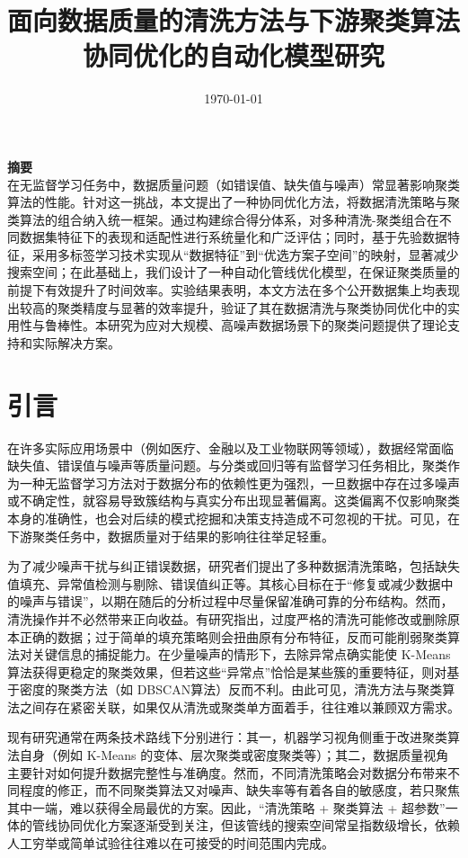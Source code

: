 \documentclass[10pt]{article} %
\numberwithin{equation}{section}
\begin{document}
\title{\textbf{面向数据质量的清洗方法与下游聚类算法协同优化的自动化模型研究}}
\date{\today}
\maketitle

\noindent\textbf{\large 摘要} \\ 
在无监督学习任务中，数据质量问题（如错误值、缺失值与噪声）常显著影响聚类算法的性能。针对这一挑战，本文提出了一种协同优化方法，将数据清洗策略与聚类算法的组合纳入统一框架。通过构建综合得分体系，对多种清洗-聚类组合在不同数据集特征下的表现和适配性进行系统量化和广泛评估；同时，基于先验数据特征，采用多标签学习技术实现从“数据特征”到“优选方案子空间”的映射，显著减少搜索空间；在此基础上，我们设计了一种自动化管线优化模型，在保证聚类质量的前提下有效提升了时间效率。实验结果表明，本文方法在多个公开数据集上均表现出较高的聚类精度与显著的效率提升，验证了其在数据清洗与聚类协同优化中的实用性与鲁棒性。本研究为应对大规模、高噪声数据场景下的聚类问题提供了理论支持和实际解决方案。

\section{引言}
在许多实际应用场景中（例如医疗、金融以及工业物联网等领域），数据经常面临缺失值、错误值与噪声等质量问题。与分类或回归等有监督学习任务相比，聚类作为一种无监督学习方法对于数据分布的依赖性更为强烈，一旦数据中存在过多噪声或不确定性，就容易导致簇结构与真实分布出现显著偏离。这类偏离不仅影响聚类本身的准确性，也会对后续的模式挖掘和决策支持造成不可忽视的干扰。可见，在下游聚类任务中，数据质量对于结果的影响往往举足轻重。

为了减少噪声干扰与纠正错误数据，研究者们提出了多种数据清洗策略，包括缺失值填充、异常值检测与剔除、错误值纠正等。其核心目标在于“修复或减少数据中的噪声与错误”，以期在随后的分析过程中尽量保留准确可靠的分布结构。然而，清洗操作并不必然带来正向收益。有研究指出，过度严格的清洗可能修改或删除原本正确的数据；过于简单的填充策略则会扭曲原有分布特征，反而可能削弱聚类算法对关键信息的捕捉能力。在少量噪声的情形下，去除异常点确实能使 K-Means 算法获得更稳定的聚类效果，但若这些“异常点”恰恰是某些簇的重要特征，则对基于密度的聚类方法（如 DBSCAN算法）反而不利。由此可见，清洗方法与聚类算法之间存在紧密关联，如果仅从清洗或聚类单方面着手，往往难以兼顾双方需求。

现有研究通常在两条技术路线下分别进行：其一，机器学习视角侧重于改进聚类算法自身（例如 K-Means 的变体、层次聚类或密度聚类等）；其二，数据质量视角主要针对如何提升数据完整性与准确度。然而，不同清洗策略会对数据分布带来不同程度的修正，而不同聚类算法又对噪声、缺失率等有着各自的敏感度，若只聚焦其中一端，难以获得全局最优的方案。因此，“清洗策略 + 聚类算法 + 超参数”一体的管线协同优化方案逐渐受到关注，但该管线的搜索空间常呈指数级增长，依赖人工穷举或简单试验往往难以在可接受的时间范围内完成。
\end{document}
